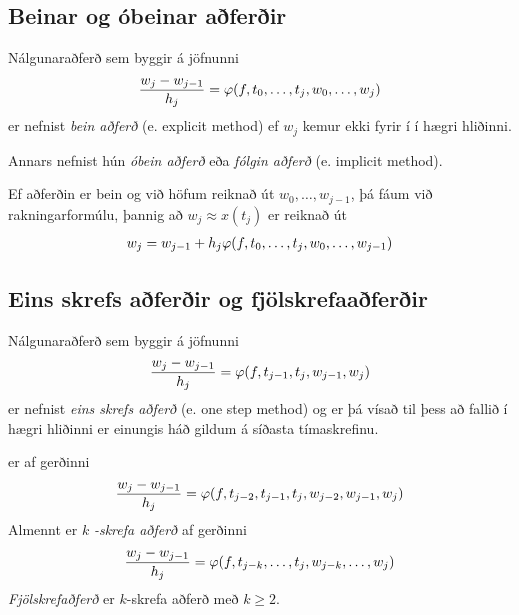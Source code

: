 \documentclass[letterpaper,10pt,icelandic]{sphinxmanual}
\begin{document}
\subsection{Beinar og óbeinar aðferðir}
\label{kafli06:index-5}\label{kafli06:beinar-og-obeinar-aferir}
Nálgunaraðferð sem byggir á jöfnunni
\begin{gather}
\begin{split}\dfrac{w_j-w_{j-1}}{h_j}=\varphi(f,t_{0},\dots,t_j,w_{0},\dots,w_j)\end{split}\notag
\end{gather}
er nefnist \emph{bein aðferð} (e. explicit method) ef \(w_j\) kemur ekki
fyrir í í hægri hliðinni.

Annars nefnist hún \emph{óbein aðferð} eða \emph{fólgin aðferð} (e. implicit
method).

Ef aðferðin er bein og við höfum reiknað út \(w_0,\dots,w_{j-1}\),
þá fáum við rakningarformúlu, þannig að \(w_j\approx x(t_j)\) er
reiknað út
\begin{gather}
\begin{split}w_j=w_{j-1}+h_j\varphi(f,t_{0},\dots,t_j,w_{0},\dots,w_{j-1})\end{split}\notag
\end{gather}

\subsection{Eins skrefs aðferðir og fjölskrefaaðferðir}
\label{kafli06:index-6}\label{kafli06:eins-skrefs-aferir-og-fjolskrefaaferir}
Nálgunaraðferð sem byggir á jöfnunni
\begin{gather}
\begin{split}\dfrac{w_j-w_{j-1}}{h_j}=\varphi(f,t_{j-1},t_j,w_{j-1},w_j)\end{split}\notag
\end{gather}
er nefnist \emph{eins skrefs aðferð} (e. one step method) og er þá vísað til
þess að fallið í hægri hliðinni er einungis háð gildum á síðasta
tímaskrefinu.

er af gerðinni
\begin{gather}
\begin{split}\dfrac{w_j-w_{j-1}}{h_j}=\varphi(f,t_{j-2},t_{j-1},t_j,w_{j-2},w_{j-1},w_j)\end{split}\notag
\end{gather}
Almennt er \(k\) \emph{-skrefa aðferð} af gerðinni
\begin{gather}
\begin{split}\dfrac{w_j-w_{j-1}}{h_j}=\varphi(f,t_{j-k},\dots,t_j,w_{j-k},\dots,w_j)\end{split}\notag
\end{gather}
\emph{Fjölskrefaðferð} er \(k\)-skrefa aðferð með \(k\geq 2\).
\end{document}
